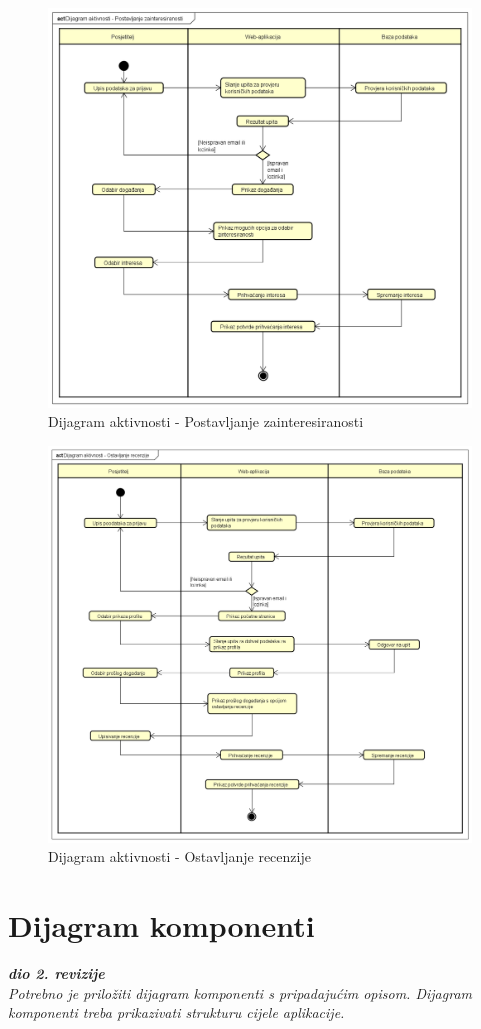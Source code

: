 			\begin{figure}[H]
			\includegraphics[width=\textwidth]{slike/Dijagram Aktivnosti - PZ.PNG} %
			\caption{Dijagram aktivnosti - Postavljanje zainteresiranosti}
			\label{fig:DAPZ} %
		\end{figure}	
		
		\begin{figure}[H]
			\includegraphics[width=\textwidth]{slike/Dijagram Aktivnosti - OR.PNG} %
			\caption{Dijagram aktivnosti - Ostavljanje recenzije}
			\label{fig:DAOR} %
		\end{figure}			
			
			\eject
		\section{Dijagram komponenti}
		
			\textbf{\textit{dio 2. revizije}}\\
		
			 \textit{Potrebno je priložiti dijagram komponenti s pripadajućim opisom. Dijagram komponenti treba prikazivati strukturu cijele aplikacije.}